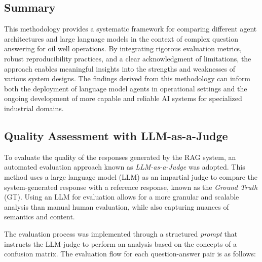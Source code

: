         \subsection{Summary}

            This methodology provides a systematic framework for comparing different agent architectures and large language models in the context of complex question answering for oil well operations. By integrating rigorous evaluation metrics, robust reproducibility practices, and a clear acknowledgment of limitations, the approach enables meaningful insights into the strengths and weaknesses of various system designs. The findings derived from this methodology can inform both the deployment of language model agents in operational settings and the ongoing development of more capable and reliable AI systems for specialized industrial domains.


        \subsection{Quality Assessment with LLM-as-a-Judge}
            \label{sec:llm_judge_evaluation}

            To evaluate the quality of the responses generated by the RAG system, an automated evaluation approach known as \textit{LLM-as-a-Judge} \cite{Zheng2023} was adopted. This method uses a large language model (LLM) as an impartial judge to compare the system-generated response with a reference response, known as the \textit{Ground Truth} (GT). Using an LLM for evaluation allows for a more granular and scalable analysis than manual human evaluation, while also capturing nuances of semantics and content.

            The evaluation process was implemented through a structured \textit{prompt} that instructs the LLM-judge to perform an analysis based on the concepts of a confusion matrix. The evaluation flow for each question-answer pair is as follows:


